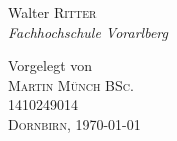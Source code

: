 \begin{titlepage}
\begin{center}
\begin{minipage}{0.48\textwidth}
\begin{center} \large
Walter \textsc{Ritter} \\ %
\emph{Fachhochschule Vorarlberg}

\end{center}
\end{minipage}
\hfill

\vspace*{\fill}

Vorgelegt von\\ [0.4cm]
\textsc{\Large Martin Münch BSc.}\\
1410249014 \\[2cm]

\textsc{ \large Dornbirn, \today}
\vfill %

\end{center}

\end{titlepage}

